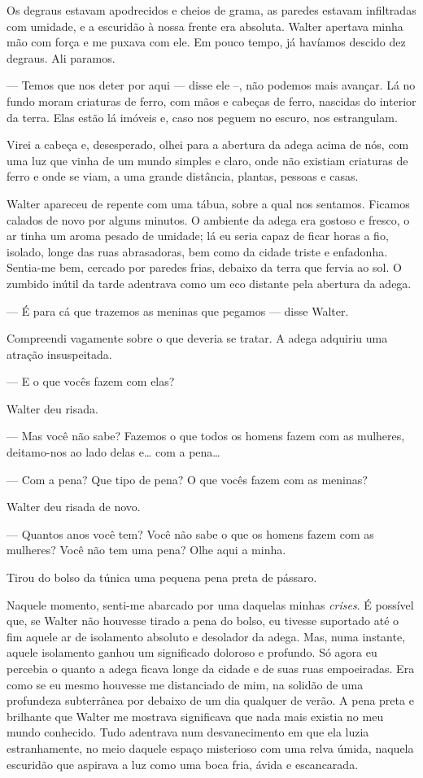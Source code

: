 Os degraus estavam apodrecidos e cheios de grama, as paredes estavam infiltradas com umidade, e a escuridão à nossa frente era absoluta. Walter apertava minha mão com força e me puxava com ele. Em pouco tempo, já havíamos descido dez degraus. Ali paramos.

--- Temos que nos deter por aqui --- disse ele --, não podemos mais avançar. Lá no fundo moram criaturas de ferro, com mãos e cabeças de ferro, nascidas do interior da terra. Elas estão lá imóveis e, caso nos peguem no escuro, nos estrangulam.

Virei a cabeça e, desesperado, olhei para a abertura da adega acima de nós, com uma luz que vinha de um mundo simples e claro, onde não existiam criaturas de ferro e onde se viam, a uma grande distância, plantas, pessoas e casas.

Walter apareceu de repente com uma tábua, sobre a qual nos sentamos. Ficamos calados de novo por alguns minutos. O ambiente da adega era gostoso e fresco, o ar tinha um aroma pesado de umidade; lá eu seria capaz de ficar horas a fio, isolado, longe das ruas abrasadoras, bem como da cidade triste e enfadonha. Sentia-me bem, cercado por paredes frias, debaixo da terra que fervia ao sol. O zumbido inútil da tarde adentrava como um eco distante pela abertura da adega.

--- É para cá que trazemos as meninas que pegamos --- disse Walter.

Compreendi vagamente sobre o que deveria se tratar. A adega adquiriu uma atração insuspeitada.

--- E o que vocês fazem com elas?

Walter deu risada.

--- Mas você não sabe? Fazemos o que todos os homens fazem com as mulheres, deitamo-nos ao lado delas e\ldots{} com a pena\ldots{}

--- Com a pena? Que tipo de pena? O que vocês fazem com as meninas?

Walter deu risada de novo.

--- Quantos anos você tem? Você não sabe o que os homens fazem com as mulheres? Você não tem uma pena? Olhe aqui a minha.

Tirou do bolso da túnica uma pequena pena preta de pássaro.

Naquele momento, senti-me abarcado por uma daquelas minhas \textit{crises}. É possível que, se Walter não houvesse tirado a pena do bolso, eu tivesse suportado até o fim aquele ar de isolamento absoluto e desolador da adega. Mas, numa instante, aquele isolamento ganhou um significado doloroso e profundo. Só agora eu percebia o quanto a adega ficava longe da cidade e de suas ruas empoeiradas. Era como se eu mesmo houvesse me distanciado de mim, na solidão de uma profundeza subterrânea por debaixo de um dia qualquer de verão. A pena preta e brilhante que Walter me mostrava significava que nada mais existia no meu mundo conhecido. Tudo adentrava num desvanecimento em que ela luzia estranhamente, no meio daquele espaço misterioso com uma relva úmida, naquela escuridão que aspirava a luz como uma boca fria, ávida e escancarada.

